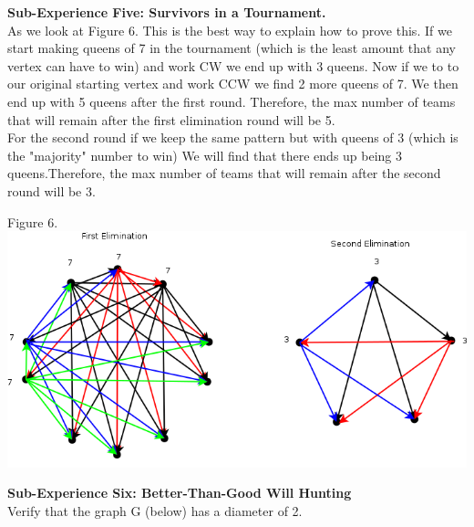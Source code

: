 \documentclass[10pt,a4paper]{report}
\begin{document}
		\begin{center}
	
		\end{center}
	\textbf{Sub-Experience Five: Survivors in a Tournament.}\\
		As we look at Figure 6. This is the best way to explain how to prove this.  If we start making queens of 7 in the tournament (which is the least amount that any vertex can have to win) and work CW we end up with 3 queens. Now if we to to our original starting vertex and work CCW we find 2 more queens of 7.  We then end up with 5 queens after the first round.  Therefore, the max number of teams that will remain after the first elimination round will be 5.\\
		\newline
		For the second round if we keep the same pattern but with queens of 3 (which is the "majority" number to win) We will find that there ends up being 3 queens.Therefore, the max number of teams that will remain after the second round will be 3.\\
		\begin{center}
			Figure 6.\\
			\includegraphics[scale=.5]{e5.png}
			\newline
			\newline
		\end{center}
	\textbf{Sub-Experience Six: Better-Than-Good Will Hunting}\\
		Verify that the graph G (below) has a diameter of 2.\\
		
\end{document}
